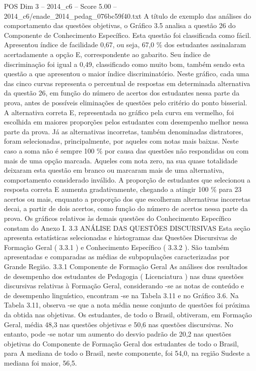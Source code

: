 \begin{textsample}{POS Dim 3 – 2014\_c6 – Score 5.00 – 2014\_c6/enade\_2014\_pedag\_076bc59f40.txt}
A título de exemplo das análises do comportamento das questões objetivas, o Gráfico 3.5 analisa a questão 26 do Componente de Conhecimento Específico.
Esta questão foi classificada como fácil.
Apresentou índice de facilidade 0,67, ou seja, 67,0 \% dos estudantes assinalaram acertadamente a opção E, correspondente ao gabarito.
Seu índice de discriminação foi igual a 0,49, classificado como muito bom, também sendo esta questão a que apresentou o maior índice discriminatório.
Neste gráfico, cada uma das cinco curvas representa o percentual de respostas em determinada alternativa da questão 26, em função do número de acertos dos estudantes nessa parte da prova, antes de possíveis eliminações de questões pelo critério do ponto bisserial.
A alternativa correta E, representada no gráfico pela curva em vermelho, foi escolhida em maiores proporções pelos estudantes com desempenho melhor nessa parte da prova.
Já as alternativas incorretas, também denominadas distratores, foram selecionadas, principalmente, por aqueles com notas mais baixas.
Neste caso a soma não é sempre 100 \% por causa das questões não respondidas ou com mais de uma opção marcada.
Aqueles com nota zero, na sua quase totalidade deixaram esta questão em branco ou marcaram mais de uma alternativa, comportamento considerado inválido.
A proporção de estudantes que selecionou a resposta correta E aumenta gradativamente, chegando a atingir 100 \% para 23 acertos ou mais, enquanto a proporção dos que escolheram alternativas incorretas decai, a partir de dois acertos, como função do número de acertos nessa parte da prova.
Os gráficos relativos às demais questões do Conhecimento Específico constam do Anexo I. 3.3 ANÁLISE DAS QUESTÕES DISCURSIVAS Esta seção apresenta estatísticas selecionadas e histogramas das Questões Discursivas de Formação Geral ( 3.3.1 ) e Conhecimento Específico ( 3.3.2 ).
São também apresentadas e comparadas as médias de subpopulações caracterizadas por Grande Região. 3.3.1 Componente de Formação Geral As análises dos resultados de desempenho dos estudantes de Pedagogia ( Licenciatura ) nas duas questões discursivas relativas à Formação Geral, considerando -se as notas de conteúdo e de desempenho linguístico, encontram -se na Tabela 3.11 e no Gráfico 3.6.
Na Tabela 3.11, observa -se que a nota média nesse conjunto de questões foi próxima da obtida nas objetivas.
Os estudantes, de todo o Brasil, obtiveram, em Formação Geral, média 48,3 nas questões objetivas e 50,6 nas questões discursivas.
No entanto, pode -se notar um aumento do desvio padrão de 20,2 nas questões objetivas do Componente de Formação Geral dos estudantes de todo o Brasil, para A mediana de todo o Brasil, neste componente, foi 54,0, na região Sudeste a mediana foi maior, 56,5.

\end{textsample}
